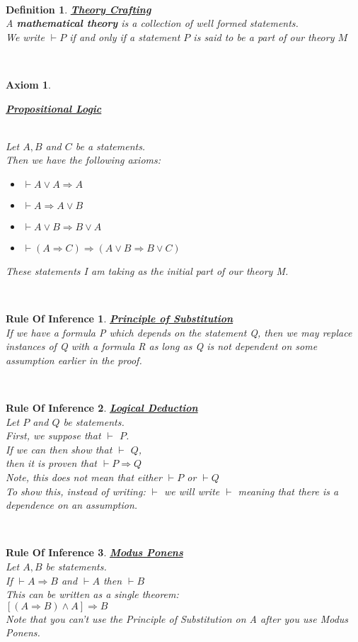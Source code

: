 \documentclass[12pt]{extarticle}
\theoremstyle{plain}
\theoremstyle{plain}
\newtheorem{axiom}{Axiom}[section]
\theoremstyle{plain}
\theoremstyle{Definition}
\newtheorem{def.}{Definition}[section]
\theoremstyle{Definition}
\theoremstyle{plain}
\theoremstyle{plain}
\newtheorem{ruleOfInference}{Rule Of Inference}[section]
\newcommand{\cut}[0]{\noindent\framebox[\linewidth]{\rule{\linewidth}{2pt}}\\}
\newcommand{\ddash}{\boxed{\vdash} }
\begin{document}
\cut
\begin{def.} \underline{\textbf{Theory Crafting}} \\ 
	A \textbf{mathematical theory} is a collection of well formed statements. \\ 	
	We write $\vdash P$ if and only if a statement $P$ is said to be a part of our theory $M$ 
\end{def.}
\cut
\begin{axiom} \hypertarget{Axioms}{\underline{\textbf{Propositional Logic}} } \\
	Let $A,B$ and $C$ be a statements.\\
	Then we have the following axioms: 
	\begin{itemize}
		\item $\vdash A \lor A \Rightarrow A$ 
		\item $\vdash A \Rightarrow A \lor B$ 
		\item $\vdash A \lor B \Rightarrow B \lor A$ 
		\item $\vdash (A \Rightarrow C) \Rightarrow ( A \lor B \Rightarrow B \lor C ) $
	\end{itemize}
	These statements I am taking as the initial part of our theory M. 
\end{axiom}
\cut 
\begin{ruleOfInference} \underline{\textbf{Principle of Substitution}} \\
If we have a formula P which depends on the statement Q, then we may replace instances of Q with a formula R as long as Q is not dependent on some assumption earlier in the proof. 
\end{ruleOfInference}
\cut
\begin{ruleOfInference} \underline{\textbf{Logical Deduction}} \\
	Let $P$ and $Q$ be statements. \\ 
	First, we suppose that $\ddash$ $P$. \\
	If we can then show that $\ddash$ $Q$, \\
	then it is proven that $\vdash P \Rightarrow Q$ \\
	Note, this does not mean that either $\vdash P$ or $\vdash Q$  \\
	To show this, instead of writing: $\vdash$ we will write $\ddash$ meaning that there is a dependence on an assumption. 
\end{ruleOfInference}
\cut 
\begin{ruleOfInference} \underline{\textbf{Modus Ponens}} \\
	Let $A,B$ be statements. \\
	If $\vdash A \Rightarrow B$ and $\vdash A$ then $\vdash B$ \\
	This can be written as a single theorem: \\ 
	$[(A \Rightarrow B) \wedge A] \Rightarrow B$ \\
	Note that you can't use the Principle of Substitution on A after you use Modus Ponens. 
\end{ruleOfInference}
\end{document}
